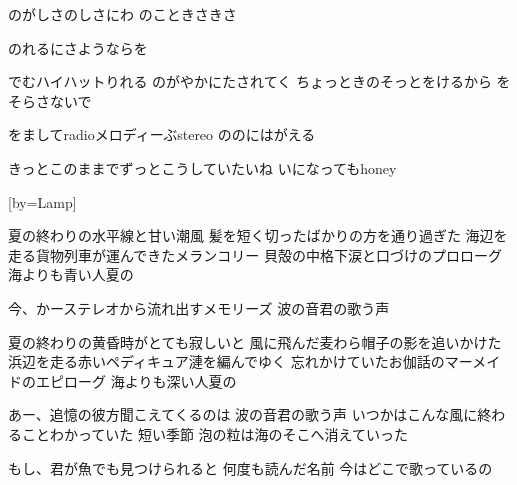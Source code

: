 \documentclass{article}
\newenvironment{Japanese}{%
\CJKfamily{min}%
\CJKtilde
\CJKnospace}{}
\begin{document}
\begin{CJK}{UTF8}{}
\begin{Japanese}
\begin{songs}{}
のがしさのしさにわ
のこときさきさ

のれるにさようならを

でむハイハットりれる
のがやかにたされてく
ちょっときのそっとをけるから
をそらさないで

をましてradioメロディーぶstereo
ののにはがえる

きっとこのままでずっとこうしていたいね
いになってもhoney
\endverse
\endsong

[by=Lamp]
\beginverse

夏の終わりの水平線と甘い潮風
髪を短く切ったばかりの方を通り過ぎた
海辺を走る貨物列車が運んできたメランコリー
貝殻の中格下涙と口づけのプロローグ
海よりも青い人夏の

今、かーステレオから流れ出すメモリーズ
波の音君の歌う声

夏の終わりの黄昏時がとても寂しいと
風に飛んだ麦わら帽子の影を追いかけた
浜辺を走る赤いペディキュア漣を編んでゆく
忘れかけていたお伽話のマーメイドのエピローグ
海よりも深い人夏の

あー、追憶の彼方聞こえてくるのは
波の音君の歌う声
いつかはこんな風に終わることわかっていた
短い季節
泡の粒は海のそこへ消えていった

もし、君が魚でも見つけられると
何度も読んだ名前
今はどこで歌っているの

\endverse
\endsong

\end{songs}
\end{Japanese}
\end{CJK}
\end{document}
